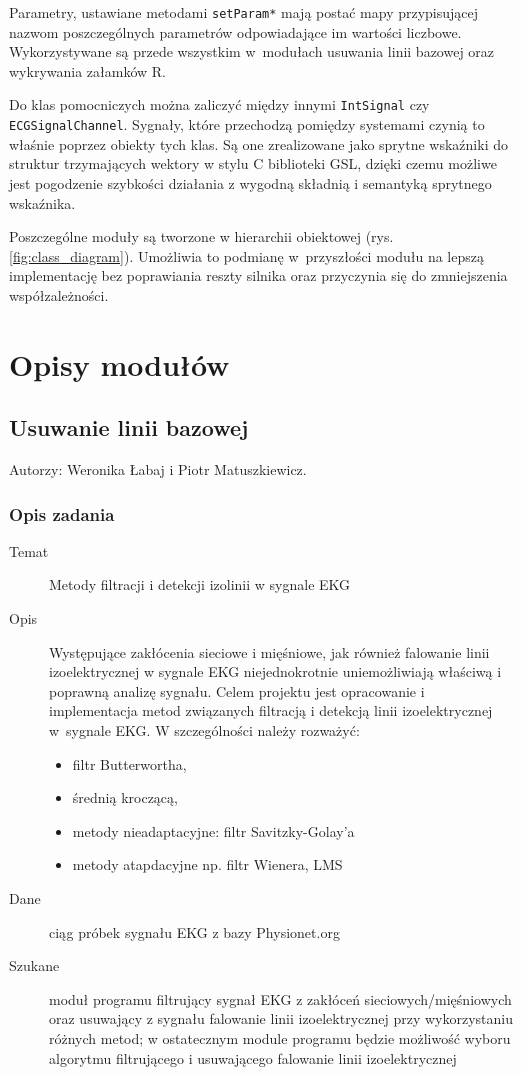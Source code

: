 \documentclass[a4paper, 11pt]{article}
\begin{document}
Parametry, ustawiane metodami \verb+setParam*+ mają postać mapy przypisującej nazwom poszczególnych parametrów odpowiadające im wartości liczbowe. Wykorzystywane są przede wszystkim w~modułach usuwania linii bazowej oraz wykrywania załamków R.

Do klas pomocniczych można zaliczyć między innymi \verb+IntSignal+ czy \verb+ECGSignalChannel+. Sygnały, które przechodzą pomiędzy systemami czynią to właśnie poprzez obiekty tych klas. Są one zrealizowane jako sprytne wskaźniki do struktur trzymających wektory w stylu C biblioteki GSL, dzięki czemu możliwe jest pogodzenie szybkości działania z wygodną składnią i semantyką sprytnego wskaźnika.

Poszczególne moduły są tworzone w hierarchii obiektowej (rys. \ref{fig:class_diagram}). Umożliwia to podmianę w~przyszłości modułu na lepszą implementację bez poprawiania reszty silnika oraz przyczynia się do zmniejszenia współzależności.

\section{Opisy modułów}
\label{sec:mod}

\subsection{Usuwanie linii bazowej}
\label{sec:baseline}
Autorzy: Weronika Łabaj i Piotr Matuszkiewicz.

\subsubsection{Opis zadania}
\label{sec:baseline:desc}

\begin{description}
\item[Temat] Metody filtracji i detekcji izolinii w sygnale EKG
\item[Opis] Występujące zakłócenia sieciowe i mięśniowe, jak również falowanie linii izoelektrycznej w sygnale EKG niejednokrotnie uniemożliwiają właściwą i poprawną analizę sygnału. Celem projektu jest opracowanie i implementacja metod związanych filtracją i detekcją linii izoelektrycznej w~sygnale EKG. W szczególności należy rozważyć:
  \begin{itemize}
  \item filtr Butterwortha,
  \item średnią kroczącą,
  \item metody nieadaptacyjne: filtr Savitzky-Golay’a
  \item metody atapdacyjne np. filtr Wienera, LMS
  \end{itemize}
\item[Dane] ciąg próbek sygnału EKG z bazy Physionet.org
\item[Szukane] moduł programu filtrujący sygnał EKG z zakłóceń sieciowych/mięśniowych oraz usuwający z sygnału falowanie linii izoelektrycznej przy wykorzystaniu różnych metod; w ostatecznym module programu będzie możliwość wyboru algorytmu filtrującego i usuwającego falowanie linii izoelektrycznej
\end{description}
\end{document}
